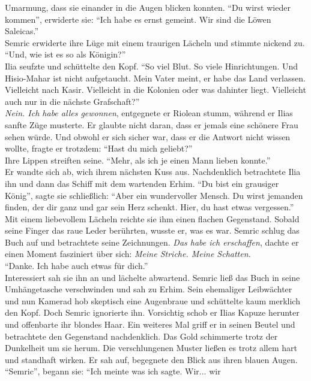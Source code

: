Umarmung, dass sie einander in die Augen blicken konnten. ``Du wirst wieder kommen'', erwiderte 
sie: ``Ich habe es ernst gemeint. Wir sind die Löwen Saleicas.''\\
Semric erwiderte ihre Lüge mit einem traurigen Lächeln und stimmte nickend zu. ``Und, wie ist es so 
als Königin?''\\
Ilia seufzte und schüttelte den Kopf. ``So viel Blut. So viele Hinrichtungen. Und Hisio-Mahar ist 
nicht aufgetaucht. Mein Vater meint, er habe das Land verlassen. Vielleicht nach Kasir. Vielleicht 
in die Kolonien oder was dahinter liegt. Vielleicht auch nur in die nächste Grafschaft?''\\
\textit{Nein. Ich habe alles gewonnen}, entgegnete er Riolean stumm, während er Ilias sanfte Züge 
musterte. Er glaubte nicht daran, dass er jemals eine schönere Frau sehen würde. Und obwohl er sich 
sicher war, dass er die Antwort nicht wissen wollte, fragte er trotzdem: ``Hast du mich geliebt?''\\
Ihre Lippen streiften seine. ``Mehr, als ich je einen Mann lieben konnte.''\\
Er wandte sich ab, wich ihrem nächsten Kuss aus. Nachdenklich betrachtete Ilia ihn und dann das 
Schiff mit dem wartenden Erhim. ``Du bist ein grausiger König'', sagte sie schließlich: ``Aber ein 
wundervoller Mensch. Du wirst jemanden finden, der dir ganz und gar sein Herz schenkt. Hier, du 
hast etwas vergessen.''\\
Mit einem liebevollem Lächeln reichte sie ihm einen flachen Gegenstand. Sobald seine Finger das 
raue Leder berührten, wusste er, was es war. Semric schlug das Buch auf und betrachtete seine 
Zeichnungen. \textit{Das habe ich erschaffen}, dachte er einen Moment fasziniert über sich: 
\textit{Meine Striche. Meine Schatten.}\\
``Danke. Ich habe auch etwas für dich.''\\
Interessiert sah sie ihn an und lächelte abwartend. Semric ließ das Buch in seine Umhängetasche 
verschwinden und sah zu Erhim. Sein ehemaliger Leibwächter und nun Kamerad hob skeptisch eine 
Augenbraue und schüttelte kaum merklich den Kopf. Doch Semric ignorierte ihn. Vorsichtig schob er 
Ilias Kapuze herunter und offenbarte ihr blondes Haar. Ein weiteres Mal griff er in seinen Beutel 
und betrachtete den Gegenstand nachdenklich. Das Gold schimmerte trotz der Dunkelheit um sie herum. 
Die verschlungenen Muster ließen es trotz allem hart und standhaft wirken. Er sah auf, begegnete 
den Blick aus ihren blauen Augen. ``Semric'', begann sie: ``Ich meinte was ich sagte. Wir... wir 
